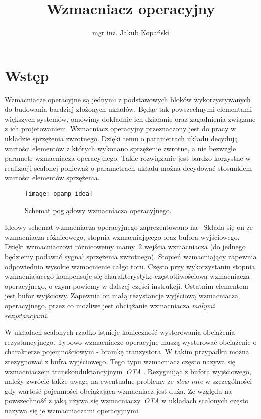 \documentclass[twoside,pl,final]{labman}
\title{Wzmacniacz operacyjny}
\author{mgr inż. Jakub Kopański}
\begin{document}
\maketitle
\tableofcontents
\clearpage
\listoffigures
\clearpage
\listoftables
\clearpage

\chapter{Wstęp}
\label{intro}
Wzmacniacze operacyjne są jednymi z podstawowych bloków wykorzystywanych do budowania bardziej złożonych układów.
Będąc tak powszechnymi elementami większych systemów, omówimy dokładnie ich działanie oraz zagadnienia związane z ich projetowaniem.
Wzmacniacz operacyjny przeznaczony jest do pracy w układzie sprzężenia zwrotnego.
Dzięki temu o parametrach układu decydują wartości elementów z których wykonano sprzężenie zwrotne,
a nie bezwzgle parametr wzmacniacza operacyjnego.
Takie rozwiązanie jest bardzo korzystne w realizacji scalonej ponieważ o parametrach układu można decydować stosunkiem wartości elementów sprzężenia.

\begin{figure}[!htbp]
  \centering
  \texttt{[image: opamp\_idea]}
  \caption{Schemat poglądowy wzmacniacza operacyjnego.}
  \label{fig:opamp:idea}
\end{figure}

Ideowy schemat wzmacniacza operacyjnego zaprezentowano na~
Składa się on ze wzmacniacza różnicowego, stopnia wzmacniającego oraz bufora wyjściowego.
Dzięki wzmacniaczowi różnicowemy mamy~2 wejścia wzmacniacza
(do jednego będziemy podawać sygnał sprzężenia zwrotnego).
Stopień wzmacniający zapewnia odpowiednio wysokie wzmocnienie całgo toru.
Często przy wykorzystaniu stopnia wzmacniającego kompensuje się charakterystyke częstotliwościową wzmacniacza operacyjnego,
o czym powiemy w dalszej części instrukcji.
Ostatnim elementem jest bufor wyjściowy.
Zapewnia on małą rezystancje wyjściową wzmacniacza operacyjnego,
przez co możliwe jest obciążanie wzmacniacza \emph{małymi rezystancjami}.

W układach scalonych rzadko istnieje konieczność wysterowania obciążenia rezystancyjnego.
Typowo wzmacniacze operacyjne muszą wysterować obciążenie o charakterze pojemnościowym - bramkę tranzystora.
W takim przypadku można zrezygnować z bufra wyjściowego.
Tego typu wzmacniacz często nazywa się wzmacniaczem transkonduktancyjnym~\emph{OTA}
.
Rezygnując z bufora wyjściowego, należy zwrócić także uwagę na ewentualne problemy ze \emph{slew rate}
w szczególności gdy wartość pojemności obciążająca wzmacniacz jest duża.
Ze względu na powszechność z jaką używa się wzmacniaczy~\emph{OTA} w układach scalonych często nazywa się je wzmacniaczami operacyjnymi.
\end{document}
